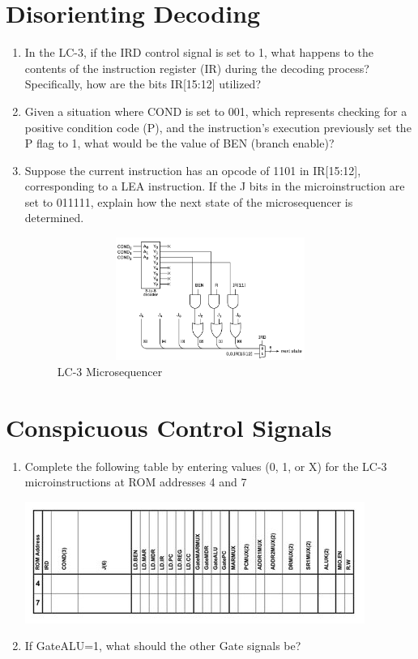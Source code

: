 \documentclass{article}
\begin{document}
\begin{enumerate}[label=(\alph*)]
    \section{Disorienting Decoding}
    \begin{enumerate}[label=(\alph*), itemsep = 120pt]
        \item In the LC-3, if the IRD control signal is set to 1, what happens to the contents of the instruction register (IR) during the decoding process? Specifically, how are the bits IR[15:12] utilized?
        \item Given a situation where COND is set to 001, which represents checking for a positive condition code (P), and the instruction’s execution previously set the P flag to 1, what would be the value of BEN (branch enable)?
        \item Suppose the current instruction has an opcode of 1101 in IR[15:12], corresponding to a LEA instruction. If the J bits in the microinstruction are set to 011111, explain how the next state of the microsequencer is determined.
        \vspace{4cm}
        \begin{figure}[ht]
            \centering
            \includegraphics[width=10cm,height=4cm]{figures/microsequencer.png}
            \caption{LC-3 Microsequencer}
            \label{fig:optionalLabel}
            \end{figure}
        \newpage
    \end{enumerate}
    
    \section{Conspicuous Control Signals}
    \begin{enumerate}[label=(\alph*),itemsep = 120pt]
        \item Complete the following table by entering values (0, 1, or X) for the LC-3 microinstructions at ROM addresses 4 and 7
        
        \includegraphics{figures/ControlSignals.jpg}
        \item If GateALU=1, what should the other Gate signals be?
        \newpage
    \end{enumerate}
    

\end{enumerate}
\end{document}
